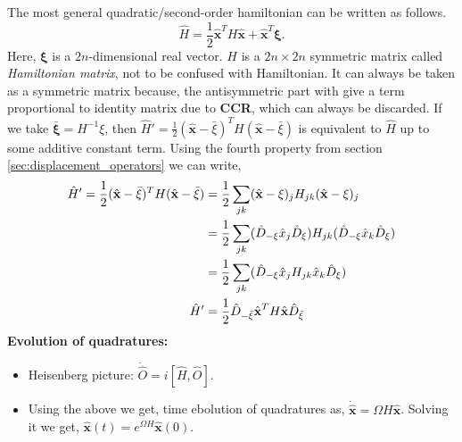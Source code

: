 \documentclass[english,10pt,a4paper]{article}
\newcommand{\xx}{\hat{\textbf{x}}}
\newcommand{\dd}[1]{\hat{D}_{#1}}
\newcommand{\ham}{\hat H}
\newcommand{\half}{\frac{1}{2}}
\begin{document}
	The most general quadratic/second-order hamiltonian can be written as follows.
	\begin{equation}
		\label{eq:quad_ham}
		\ham = \half \xx^T H \xx + \xx^T \mathbf{\xi}.
	\end{equation}
	Here, $\mathbf{\xi}$ is a $2n$-dimensional real vector. $H$ is a $2n\times 2n$ symmetric matrix called \textit{Hamiltonian matrix}, not to be confused with Hamiltonian. It can always be taken as  a symmetric matrix because, the antisymmetric part with give a term proportional to identity matrix due to \textbf{CCR}, which can always be discarded. If we take $\bar{\mathbf{\xi}}=H^{-1}\xi$, then $\hat{H}' = \half (\xx-\bar{\xi})^T H (\xx-\bar{\xi})$ is equivalent to $\hat{H}$ up to some additive constant term. Using the fourth property from section \ref{sec:displacement_operators} we can write,
	\begin{align}
		\hat{H}' = \half (\xx-\bar{\xi})^T H (\xx-\bar{\xi}) &= \half \sum_{jk} (\xx-\xi) _j H_{jk} (\xx-\xi) _j \notag \\
		&= \half \sum_{jk} (\dd{-\xi} \hat x_j \dd{\xi})  H_{jk} (\dd{-\xi} \hat x_k \dd{\xi})  \notag\\
		&= \half \sum_{jk} (\dd{-\xi} \hat x_j H_{jk} \hat x_k \dd{\xi}) \notag\\
		\hat{H}'&= \half \dd{-\bar{\xi}} \xx^T H \xx \dd{\bar{\xi}}
	\end{align} 
	\vspace*{-\abovedisplayskip}
	\textbf{Evolution of quadratures:} 
	\begin{itemize}
		\item Heisenberg picture: $\dot{\hat O} = i[\hat{H}, \hat{O}]$.
		\item Using the above we get, time ebolution of quadratures as, $\dot{\xx} = \Omega H \xx$. Solving it we get, $\xx(t) = e^{\Omega H} \xx(0)$.
		
	\end{itemize}
	
\end{document}
